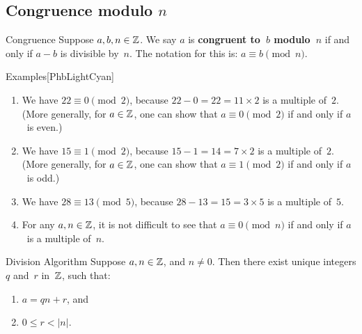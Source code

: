 \documentclass[../MATH-2000-Notes.tex]{subfiles}
\begin{document}
\subsection{Congruence modulo \texorpdfstring{\(n\)}{}}
\begin{Definition}
    {Congruence}
    Suppose $a,b,n \in \mathbb{Z}$. We say $a$ is \textbf{congruent to~$b$ modulo~$n$} if and only if $a - b$ is divisible by~$n$. The notation for this is:
    $ a \equiv b \pmod{n} $.
\end{Definition}
\begin{commentbox}{Examples}[{PhbLightCyan}]
    \begin{enumerate}
        \item \label{CongruenceEasyEg-even}
              We have $22 \equiv 0 \pmod{2}$, because $22 - 0 = 22 = 11 \times 2$ is a multiple of~$2$.  (More generally, for $a \in \mathbb{Z}$, one can show that $a \equiv 0 \pmod{2}$ if and only if $a$~is even.)
        \item \label{CongruenceEasyEg-odd}
              We have $15 \equiv 1 \pmod{2}$, because $15 - 1 = 14 =  7 \times 2$ is a multiple of~$2$. (More generally, for $a \in \mathbb{Z}$, one can show that $a \equiv 1 \pmod{2}$ if and only if $a$~is odd.)
        \item We have $28 \equiv 13 \pmod{5}$, because $28 - 13 = 15 = 3 \times 5$ is a multiple of~$5$.
        \item For any $a,n \in \mathbb{Z}$, it is not difficult to see that $a \equiv 0 \pmod{n}$ if and only if $a$~is a multiple of~$n$.
    \end{enumerate}
\end{commentbox}

\begin{Theorem}
    {Division Algorithm}\label{DivAlgThm}
    Suppose $a,n \in \mathbb{Z}$, and $n \neq 0$.
    Then there exist unique integers $q$ and~$r$ in~$\mathbb{Z}$, such that:
    \begin{enumerate}
        \item $a = qn + r$,
              and
        \item $0 \le r < |n|$.
    \end{enumerate}
\end{Theorem}
\end{document}
